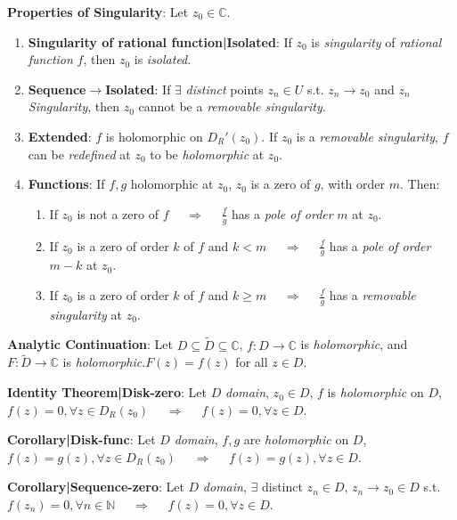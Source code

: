 \documentclass[9pt]{article}
\begin{document}
\textbf{Properties of Singularity}: Let $z_0\in\mathbb{C}$.

\begin{enumerate}[itemsep=-2pt, topsep=-2pt]
    \item \textbf{Singularity of rational function|Isolated}: If $z_0$ is \textit{singularity} of \textit{rational function} $f$, then $z_0$ is \textit{isolated}.
    \item \np\textbf{Sequence$\to$Isolated}: If $\exists$ \textit{distinct} points $z_n\in U$ s.t. $z_n\to z_0$ and $z_n$ \textit{Singularity}, then $z_0$ cannot be a \textit{removable singularity}.
    \item \textbf{Extended}: {\scriptsize $f$ is holomorphic on $D_{R}'(z_0)$.} If $z_0$ is a \textit{removable singularity}, $f$ can be \textit{redefined} at $z_0$ to be \textit{holomorphic} at $z_0$. 
    \item \textbf{Functions}: If $f,g$ holomorphic at $z_0$, \quad $z_0$ is a zero of $g$, with order $m$. \quad Then:
    \begin{enumerate}[itemsep=-2pt, topsep=-2pt]
        \item If $z_0$ is not a zero of $f$ \ \ $\Rightarrow$ \ \ $\frac{f}{g}$ has a \textit{pole of order} $m$ at $z_0$.
        \item If $z_0$ is a zero of order $k$ of $f$ and $k<m$ \ \ $\Rightarrow$ \ \ $\frac{f}{g}$ has a \textit{pole of order} $m-k$ at $z_0$.
        \item If $z_0$ is a zero of order $k$ of $f$ and $k\geq m$ \ \ $\Rightarrow$ \ \ $\frac{f}{g}$ has a \textit{removable singularity} at $z_0$.
    \end{enumerate}
\end{enumerate}

\textbf{Analytic Continuation}: Let $D\subseteq\widetilde{D}\subseteq\mathbb{C}$, $f:D\to\mathbb{C}$ is \textit{holomorphic}, and $F:\widetilde{D}\to\mathbb{C}$ is \textit{holomorphic}.\quad $F(z)=f(z)$ for all $z\in D$.

\textbf{Identity Theorem|Disk-zero}: Let $D$ \textit{domain}, $z_0\in D$, $f$ is \textit{holomorphic} on $D$, $f(z)=0,\forall z\in D_{R}(z_0)$ \ \ $\Rightarrow$ \ \ $f(z)=0,\forall z\in D$.

\quad\textbf{Corollary|Disk-func}: Let $D$ \textit{domain}, $f,g$ are \textit{holomorphic} on $D$, $f(z)=g(z),\forall z\in D_{R}(z_0)$ \ \ $\Rightarrow$ \ \ $f(z)=g(z),\forall z\in D$.

\quad\textbf{Corollary|Sequence-zero}: Let $D$ \textit{domain}, $\exists$ distinct $z_n\in D$, $z_n\to z_0\in D$ s.t. $f(z_n)=0,\forall n\in\mathbb{N}$ \ \ $\Rightarrow$ \ \ $f(z)=0,\forall z\in D$.
\end{document}
